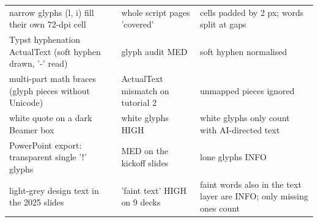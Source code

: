\documentclass[10pt,a4paper]{article}
\begin{document}
\begin{longtable}{@{}P{6cm}P{4.6cm}P{6.4cm}@{}}
\footnotesize narrow glyphs (l, i) fill their own 72-dpi cell & \footnotesize whole script pages 'covered' & \footnotesize cells padded by 2 px; words split at gaps\\
\footnotesize Typst hyphenation ActualText (soft hyphen drawn, '-' read) & \footnotesize glyph audit MED & \footnotesize soft hyphen normalised\\
\footnotesize multi-part math braces (glyph pieces without Unicode) & \footnotesize ActualText mismatch on tutorial 2 & \footnotesize unmapped pieces ignored\\
\footnotesize white quote on a dark Beamer box & \footnotesize white glyphs HIGH & \footnotesize white glyphs only count with AI-directed text\\
\footnotesize PowerPoint export: transparent single '!' glyphs & \footnotesize MED on the kickoff slides & \footnotesize lone glyphs INFO\\
\footnotesize light-grey design text in the 2025 slides & \footnotesize 'faint text' HIGH on 9 decks & \footnotesize faint words also in the text layer are INFO; only missing ones count\\
\bottomrule\end{longtable}
\end{document}
